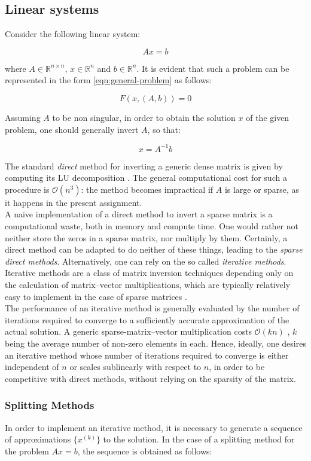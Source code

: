 \documentclass{article}
\theoremstyle{theorem}
\theoremstyle{definition}
\begin{document}
\subsection{Linear systems}
Consider the following linear system:

$$Ax=b$$

where $A\in\mathbb{R}^{n\times n}$, $x\in\mathbb{R}^n$ and $b\in\mathbb{R}^n$. It is evident that such a problem can be represented in the form \eqref{eqn:general-problem} as follows:

$$F(x,(A,b))=0$$ 

Assuming $A$ to be non singular, in order to obtain the solution $x$ of the given problem, one should generally invert $A$, so that:

$$x=A^{-1}b$$ 

The standard \emph{direct} method for inverting a generic dense matrix is given by computing its LU decomposition \cite{lec-notes}. The general computational cost for such a procedure is $\mathcal{O}(n^3)$: the method becomes impractical if $A$ is large or sparse, as it happens in the present assignment.\\
A naive implementation of a direct method to invert a sparse matrix is a computational waste, both in memory and compute time. One would rather not neither store the zeros in a sparse matrix, nor multiply by them. Certainly, a direct method can be adapted to do neither of these things, leading to the \emph{sparse direct methods}. Alternatively, one can rely on the so called \emph{iterative methods}. Iterative methods are a class of matrix inversion techniques depending only on the calculation of matrix–vector multiplications, which are typically relatively easy to implement in the case of sparse matrices \cite{lec-notes}.\\
The performance of an iterative method is generally evaluated by the number of iterations required to converge to a sufficiently accurate approximation of the actual solution. A generic sparse-matrix–vector multiplication costs $\mathcal{O}(kn)$ , $k$ being the average number of non-zero elements in each. Hence, ideally, one desires an iterative method whose number of iterations required to converge is either independent of $n$ or scales sublinearly with respect to $n$, in order to be competitive with direct methods, without relying on the sparsity of the matrix.\\

\subsubsection{Splitting Methods}
In order to implement an iterative method, it is necessary to generate a sequence of approximations $\lbrace x^{(k)}\rbrace$ to the solution. In the case of a splitting method for the problem $Ax=b$, the sequence is obtained as follows:
\end{document}
